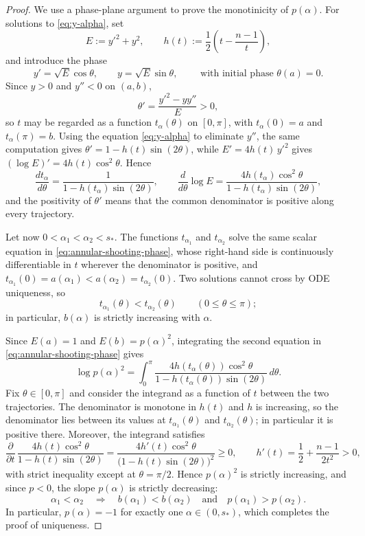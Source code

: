 \documentclass[11pt]{article}
\numberwithin{equation}{section}
\theoremstyle{definition}
\begin{document}
\begin{proof}
We use a phase-plane argument to prove the monotinicity of $p(\alpha)$. For solutions to \eqref{eq:y-alpha}, set
\[
 E:=y'^2+y^2, \qquad h(t):=\frac12\left(t-\frac{n-1}{t}\right),
\]
and introduce the phase
\[
 y'=\sqrt E\cos\theta,
 \qquad
 y=\sqrt E\sin\theta,
 \qquad \text{ with initial phase }
 \theta(a)=0.
\]
Since $y>0$ and $y''<0$ on $(a,b)$,
\[
 \theta'=\frac{y'^2-yy''}{E}>0,
\]
so $t$ may be regarded as a function $t_\alpha(\theta)$ on $[0,\pi]$, with $t_\alpha(0)=a$ and $t_\alpha(\pi)=b$. Using the equation \eqref{eq:y-alpha} to eliminate $y''$, the same computation gives $\theta'=1-h(t)\sin(2\theta)$, while $E'=4h(t)\,y'^2$ gives $(\log E)'=4h(t)\cos^2\theta$. Hence
\begin{equation}\label{eq:annular-shooting-phase}
 \frac{dt_\alpha}{d\theta}
 =\frac1{1-h(t_\alpha)\sin(2\theta)},
 \qquad
 \frac{d}{d\theta}\log E
 =\frac{4h(t_\alpha)\cos^2\theta}{1-h(t_\alpha)\sin(2\theta)},
\end{equation}
and the positivity of $\theta'$ means that the common denominator is positive along every trajectory.

Let now $0< \alpha_1<\alpha_2< s_*$. The functions $t_{\alpha_1}$ and $t_{\alpha_2}$ solve the same scalar equation in \eqref{eq:annular-shooting-phase}, whose right-hand side is continuously differentiable in $t$ wherever the denominator is positive, and
$t_{\alpha_1}(0)=a(\alpha_1)<a(\alpha_2)=t_{\alpha_2}(0)$. Two solutions cannot cross by ODE uniqueness, so
\[
 t_{\alpha_1}(\theta)<t_{\alpha_2}(\theta)
 \qquad(0\leq\theta\leq\pi);
\]
in particular, $b(\alpha)$ is strictly increasing with $\alpha$.

Since $E(a)=1$ and $E(b)=p(\alpha)^2$, integrating the second equation in \eqref{eq:annular-shooting-phase} gives
\[
 \log p(\alpha)^2
 =\int_0^\pi
 \frac{4h(t_\alpha(\theta))\cos^2\theta}
 {1-h(t_\alpha(\theta))\sin(2\theta)}\,d\theta.
\]
Fix $\theta\in [0,\pi]$ and consider the integrand as a function of $t$ between the two trajectories. The denominator is monotone in $h(t)$ and $h$ is increasing, so the denominator lies between its values at $t_{\alpha_1}(\theta)$ and $t_{\alpha_2}(\theta)$; in particular it is positive there. Moreover, the integrand satisfies
\[
 \frac{\partial}{\partial t}\,
 \frac{4h(t)\cos^2\theta}{1-h(t)\sin(2\theta)}
 =\frac{4h'(t)\cos^2\theta}{\bigl(1-h(t)\sin(2\theta)\bigr)^2} 
 \geq0,
 \qquad
 h'(t)=\frac12+\frac{n-1}{2t^2}>0,
\]
with strict inequality except at $\theta=\pi/2$. Hence $p(\alpha)^2$ is strictly increasing, and since $p<0$, the slope $p(\alpha)$ is strictly decreasing:
\begin{equation}\label{eq:annular-shooting-monotonicity}
 \alpha_1<\alpha_2
 \quad\Longrightarrow\quad
 b(\alpha_1)<b(\alpha_2)
 \quad\text{and}\quad
 p(\alpha_1)>p(\alpha_2).
\end{equation}
In particular, $p(\alpha)=-1$ for exactly one $\alpha\in(0,s_*)$, which completes the proof of uniqueness.

\end{proof}
\end{document}
